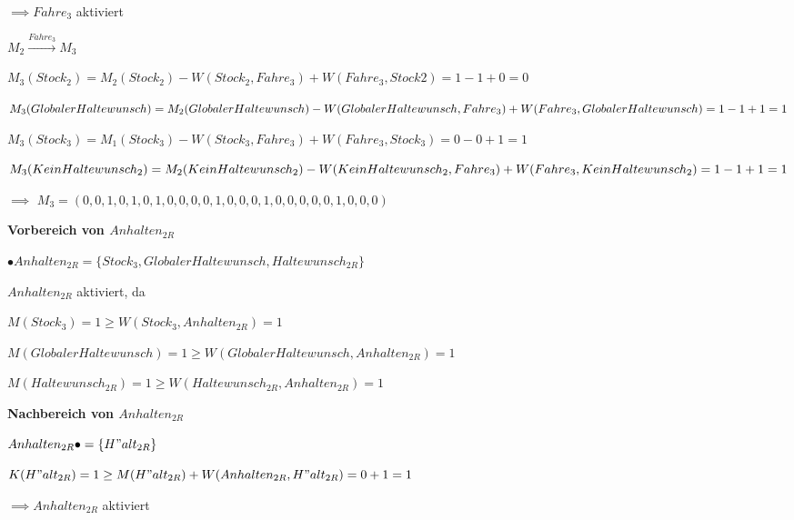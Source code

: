 \documentclass{scrreprt}
\begin{document}
\begin{enumerate}
\begin{addmargin}[1cm]{0cm}
  $\implies Fahre_3$ aktiviert
\end{addmargin}


$M_2 \xrightarrow{Fahre_3} M_3$

\begin{addmargin}[1cm]{0cm}
  $M_3(Stock_2) = M_2(Stock_2) - W(Stock_2, Fahre_3) + W(Fahre_3, Stock2) = 1 - 1 + 0 = 0$

  $M_3(GlobalerHaltewunsch) = M_2(GlobalerHaltewunsch) - \\ W(GlobalerHaltewunsch, Fahre_3) + \\ W(Fahre_3, GlobalerHaltewunsch) = 1 - 1 + 1 = 1$

  $M_3(Stock_3) = M_1(Stock_3) - W(Stock_3, Fahre_3) + W(Fahre_3, Stock_3) = 0 - 0 + 1 = 1$

  $M_3(KeinHaltewunsch_2) = M_2(KeinHaltewunsch_2) - \\ W(KeinHaltewunsch_2, Fahre_3) + \\ W(Fahre_3, KeinHaltewunsch_2) = 1 - 1 + 1 = 1$

  $\implies$ 
  $M_3 = (
  0, 0, 1, 0, 1, 
  0, 1, 0, 0, 0, 
  0, 1, 0, 0, 0, 
  1, 0, 0, 0, 0, 
  0, 1, 0, 0, 0
  )$
\end{addmargin}


\textbf{Vorbereich von $Anhalten_{2R}$}

\begin{addmargin}[1cm]{0cm}
  $\bullet Anhalten_{2R} = \{ Stock_3, GlobalerHaltewunsch, Haltewunsch_{2R} \}$

  $Anhalten_{2R}$ aktiviert, da

  $M(Stock_3) = 1 \geq W(Stock_3, Anhalten_{2R}) = 1$  

  $M(GlobalerHaltewunsch) = 1 \geq W(GlobalerHaltewunsch, Anhalten_{2R}) = 1$

  $M(Haltewunsch_{2R}) = 1 \geq W(Haltewunsch_{2R}, Anhalten_{2R}) = 1$
\end{addmargin}

\textbf{Nachbereich von $Anhalten_{2R}$}

\begin{addmargin}[1cm]{0cm}
  $Anhalten_{2R} \bullet = \{ H"alt_{2R} \}$

  $K(H"alt_{2R}) = 1 \geq M(H"alt_{2R}) + W(Anhalten_{2R}, H"alt_{2R}) = 0 + 1 = 1$

  $\implies Anhalten_{2R}$ aktiviert
\end{addmargin}


\end{enumerate}
\end{document}
